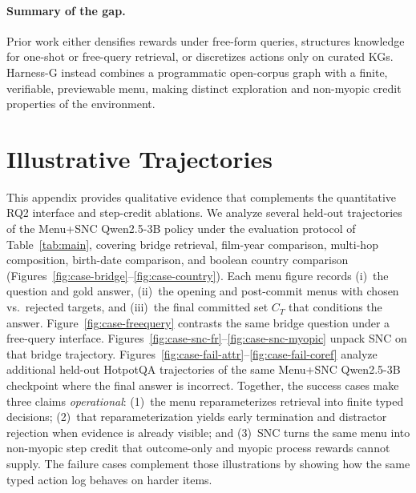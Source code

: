 \documentclass[letterpaper]{article} %
\begin{document}
\paragraph{Summary of the gap.}
Prior work either densifies rewards under free-form queries, structures knowledge for one-shot or free-query retrieval, or discretizes actions only on curated KGs.
Harness-G instead combines a programmatic open-corpus graph with a finite, verifiable, previewable menu, making distinct exploration and non-myopic credit properties of the environment.

\section{Illustrative Trajectories}
\label{app:cases}

This appendix provides qualitative evidence that complements the quantitative RQ2 interface and step-credit ablations.
We analyze several held-out trajectories of the Menu+SNC Qwen2.5-3B policy under the evaluation protocol of Table~\ref{tab:main}, covering bridge retrieval, film-year comparison, multi-hop composition, birth-date comparison, and boolean country comparison (Figures~\ref{fig:case-bridge}--\ref{fig:case-country}).
Each menu figure records (i)~the question and gold answer, (ii)~the opening and post-commit menus with chosen vs.\ rejected targets, and (iii)~the final committed set $C_T$ that conditions the answer.
Figure~\ref{fig:case-freequery} contrasts the same bridge question under a free-query interface.
Figures~\ref{fig:case-snc-fr}--\ref{fig:case-snc-myopic} unpack SNC on that bridge trajectory.
Figures~\ref{fig:case-fail-attr}--\ref{fig:case-fail-coref} analyze additional held-out HotpotQA trajectories of the same Menu+SNC Qwen2.5-3B checkpoint where the final answer is incorrect.
Together, the success cases make three claims \emph{operational}: (1)~the menu reparameterizes retrieval into finite typed decisions; (2)~that reparameterization yields early termination and distractor rejection when evidence is already visible; and (3)~SNC turns the same menu into non-myopic step credit that outcome-only and myopic process rewards cannot supply.
The failure cases complement those illustrations by showing how the same typed action log behaves on harder items.
\end{document}
